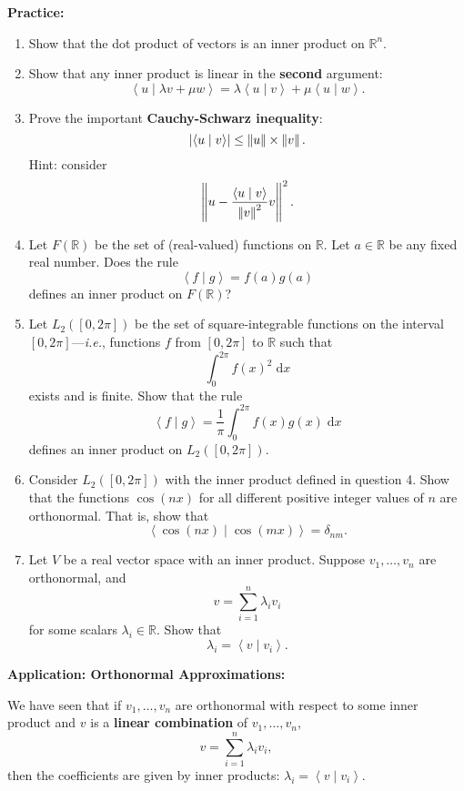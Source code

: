 \documentclass{article}
\newcommand{\diff}{\;\mathrm{d}}
\newcommand{\norm}[1]{\left|\kern-1pt\left|#1\right|\kern-1pt\right|}
\newcommand{\braket}[2]{\left\langle #1 \mid #2 \right\rangle}
\begin{document}
\clearpage


\textbf{Practice:}\bigskip


\begin{enumerate}
	\item Show that the dot product of vectors is an inner product on $\mathbb{R}^n$.
	\item Show that any inner product is linear in the \textbf{second} argument:
		\[\braket{u}{\lambda v + \mu w}=\lambda\braket{u}{v}+\mu\braket{u}{w}.\]
	\item Prove the important \textbf{Cauchy-Schwarz inequality}:
		\[\left| \braket{u}{v}\right| \leq \norm{u}\times \norm{v}.\]
		Hint: consider
		\[\norm{u-\frac{\braket{u}{v}}{\norm{v}^2}v}^2.\]
	\item Let $F(\mathbb{R})$ be the set of (real-valued) functions on $\mathbb{R}$. Let $a\in\mathbb{R}$ be any fixed real number. Does the rule
		\[\braket{f}{g}=f(a)g(a)\]
		defines an inner product on $F(\mathbb{R})$?
	\item Let $L_2([0,2\pi])$ be the set of square-integrable functions on the interval $[0,2\pi]$---\textit{i.e.}, functions $f$ from $[0,2\pi]$ to $\mathbb{R}$ such that
		\[\int_0^{2\pi} f(x)^2\diff x\]
		exists and is finite. Show that the rule
		\[\braket{f}{g}=\frac{1}{\pi}\int_0^{2\pi} f(x)g(x)\diff x\]
		defines an inner product on $L_2([0,2\pi])$.
	\item Consider $L_2([0,2\pi])$ with the inner product defined in question 4. Show that the functions $\cos(nx)$ for all different positive integer values of $n$ are orthonormal. That is, show that
		\[\braket{\cos(nx)}{\cos(mx)}=\delta_{nm}.\]
	\item Let $V$ be a real vector space with an inner product. Suppose $v_1,\hdots,v_n$ are orthonormal, and
		\[v=\sum_{i=1}^n \lambda_i v_i\]
		for some scalars $\lambda_i\in\mathbb{R}$. Show that
		\[\lambda_i=\braket{v}{v_i}.\]
\end{enumerate}

\clearpage









\textbf{Application: Orthonormal Approximations:}\bigskip

We have seen that if $v_1,\hdots,v_n$ are orthonormal with respect to some inner product and $v$ is a \textbf{linear combination} of $v_1,\hdots,v_n$,
\[v=\sum_{i=1}^n \lambda_i v_i,\]
then the coefficients are given by inner products: $\lambda_i=\braket{v}{v_i}$.
\end{document}

